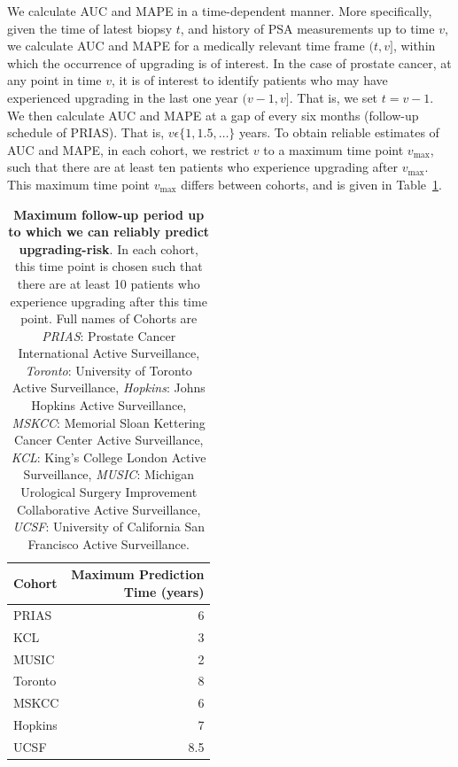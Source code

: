 We calculate AUC and MAPE in a time-dependent manner. More specifically, given the time of latest biopsy $t$, and history of PSA measurements up to time $v$, we calculate AUC and MAPE for a medically relevant time frame $(t, v]$, within which the occurrence of upgrading is of interest. In the case of prostate cancer, at any point in time $v$, it is of interest to identify patients who may have experienced upgrading in the last one year $(v-1, v]$. That is, we set $t=v-1$. We then calculate AUC and MAPE at a gap of every six months (follow-up schedule of PRIAS). That is, $v \epsilon \{1, 1.5, \ldots \}$ years. To obtain reliable estimates of AUC and MAPE, in each cohort, we restrict $v$ to a maximum time point $v_{\mbox{max}}$, such that there are at least ten patients who experience upgrading after $v_{\mbox{max}}$. This maximum time point $v_{\mbox{max}}$ differs between cohorts, and is given in Table~\ref{tab:max_pred_time}.

\begin{table}[!htb]
\small\sf\centering
\caption{\textbf{Maximum follow-up period up to which we can reliably predict upgrading-risk}. In each cohort, this time point is chosen such that there are at least 10 patients who experience upgrading after this time point. Full names of Cohorts are \textit{PRIAS}: Prostate Cancer International Active Surveillance, \textit{Toronto}: University of Toronto Active Surveillance, \textit{Hopkins}: Johns Hopkins Active Surveillance, \textit{MSKCC}: Memorial Sloan Kettering Cancer Center Active Surveillance, \textit{KCL}: King's College London Active Surveillance, \textit{MUSIC}: Michigan Urological Surgery Improvement Collaborative Active Surveillance, \textit{UCSF}: University of California San Francisco Active Surveillance.}
\label{tab:max_pred_time}
\begin{tabular}{l|r}
\hline
\hline
Cohort & \parbox[t]{3.5cm}{Maximum Prediction\\Time (years)}\\
\hline
PRIAS & 6\\
KCL & 3\\
MUSIC & 2\\
Toronto & 8\\
MSKCC & 6\\
Hopkins & 7\\
UCSF & 8.5\\
\hline
\end{tabular}    
\end{table}

